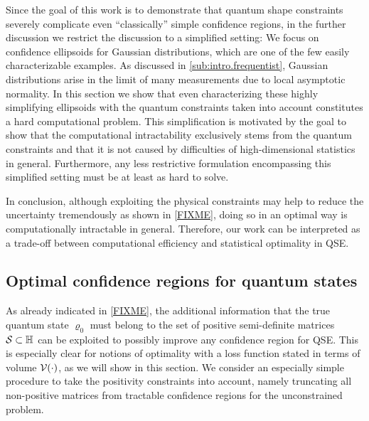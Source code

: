 Since the goal of this work is to demonstrate that quantum shape constraints severely complicate even ``classically'' simple confidence regions, in the further discussion we restrict the discussion to a simplified setting:
We focus on confidence ellipsoids for Gaussian distributions, which are one of the few easily characterizable examples.
As discussed in \cref{sub:intro.frequentist}, Gaussian distributions arise in the limit of many measurements due to local asymptotic normality.
In this section we show that even characterizing these highly simplifying ellipsoids with the quantum constraints taken into account constitutes a hard computational problem.
This simplification is motivated by the goal to show that the computational intractability exclusively stems from the quantum constraints and that it is not caused by difficulties of high-dimensional statistics in general.
Furthermore, any less restrictive formulation encompassing this simplified setting must be at least as hard to solve.

In conclusion, although exploiting the physical constraints may help to reduce the uncertainty tremendously as shown in \cref{FIXME}, doing so in an optimal way is computationally intractable in general.
Therefore, our work can be interpreted as a trade-off between computational efficiency and statistical optimality in QSE.

\subsection{Optimal confidence regions for quantum states}
\label{sub:ortho.optimal}

As already indicated in \cref{FIXME}, the additional information that the true quantum state $\varrho_0$ must belong to the set of positive semi-definite matrices $\mathcal{S} \subset \mathbb{H}$ can be exploited to possibly improve any confidence region for QSE.
This is especially clear for notions of optimality with a loss function stated in terms of volume $\mathcal{V}(\cdot)$, as we will show in this section.
We consider an especially simple procedure to take the positivity constraints into account, namely truncating all non-positive matrices from tractable confidence regions for the unconstrained problem.

